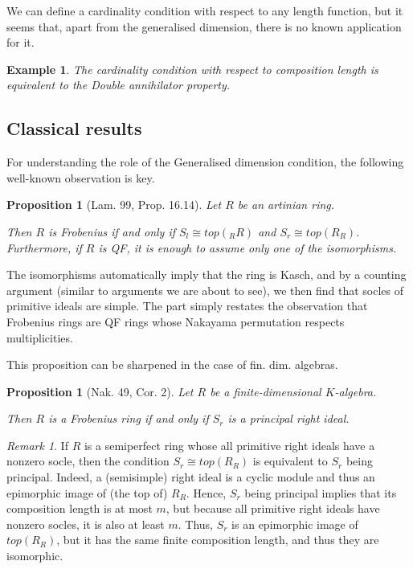 \documentclass[11pt]{article}
\theoremstyle{plain}
\newtheorem{Prop}[veta]{Proposition}
\newtheorem{Ex}[veta]{Example}
\theoremstyle{remark}
\newtheorem*{remark}{Remark}
\theoremstyle{plain}
\begin{document}
We can define a cardinality condition with respect to any length function, but it seems that, apart from the generalised dimension, there is no known application for it.
\begin{Ex}
     The cardinality condition with respect to composition length is equivalent to the Double annihilator property.
\end{Ex}

\subsection{Classical results} \label{SecCardClass}

For understanding the role of the Generalised dimension condition, the following well-known observation is key.
\begin{Prop}[Lam. 99, Prop. 16.14]\label{PropLamQF}
Let $R$ be an artinian ring. 

Then $R$ is Frobenius if and only if $S_l\cong top({_R}R)$ and $S_r\cong top(R_R)$. Furthermore, if $R$ is QF, it is enough to assume only one of the isomorphisms.    
\end{Prop}
The isomorphisms automatically imply that the ring is Kasch, and by a counting argument (similar to arguments we are about to see), we then find that socles of primitive ideals are simple. The  part simply restates the observation that Frobenius rings are QF rings whose Nakayama permutation respects multiplicities.

This proposition can be sharpened in the case of fin. dim. algebras. 
\begin{Prop}[Nak. 49, Cor. 2] \label{PropNakPrinc}
Let $R$ be a finite-dimensional $K$-algebra.

Then $R$ is a Frobenius ring if and only if $S_r$ is a principal right ideal.     
\end{Prop}
\begin{remark}
    If $R$ is a semiperfect ring whose all primitive right ideals have a nonzero socle, then the condition $S_r\cong top(R_R)$ is equivalent to $S_r$ being principal. Indeed, a (semisimple) right ideal is a cyclic module and thus an epimorphic image of (the top of) $R_R$. Hence, $S_r$ being principal implies that its composition length is at most $m$, but because all primitive right ideals have nonzero socles, it is also at least $m$. Thus, $S_r$ is an epimorphic image of $top(R_R)$, but it has the same finite composition length, and thus they are isomorphic.
\end{remark}
\end{document}
